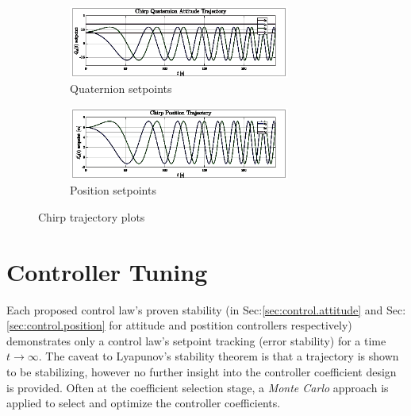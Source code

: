 \begin{figure}[htbp]
\vspace{-6pt}
\centering
\begin{subfigure}{\textwidth}
\centering
\includegraphics[width=0.8\textwidth]{graphs/Attitude_Trajectory}
\vspace{-6pt}
\caption{Quaternion setpoints}
\label{fig:Attitude_Trajectory}
\end{subfigure}
\begin{subfigure}{\textwidth}
\centering
\includegraphics[width=0.8\textwidth]{graphs/Position_Trajectory}
\vspace{-6pt}
\caption{Position setpoints}
\label{fig:Position_Trajectory}
\end{subfigure}
\vspace{-8pt}
\caption{Chirp trajectory plots}
\label{fig:Trajectory_Plot}
\vspace{-12pt}
\end{figure}
\section{Controller Tuning}
\label{sec:simulation.tuning}
Each proposed control law's proven stability (in Sec:\ref{sec:control.attitude} and Sec:\ref{sec:control.position} for attitude and postition controllers respectively) demonstrates only a control law's setpoint tracking (error stability) for a time $t\rightarrow\infty$. The caveat to Lyapunov's stability theorem is that a trajectory is shown to be stabilizing, however no further insight into the controller coefficient design is provided. Often at the coefficient selection stage, a \emph{Monte Carlo} approach is applied to select and optimize the controller coefficients.
